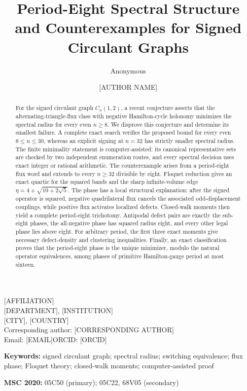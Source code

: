\title{Period-Eight Spectral Structure and Counterexamples for Signed Circulant Graphs}
\ifdefined\TargetAAnonymous
  \author{Anonymous}
\else
  \author{[AUTHOR NAME]}
\fi
\date{}
\maketitle

\ifdefined\TargetAAnonymous\else
\begin{center}
\small
\mbox{[AFFILIATION]}\\
\mbox{[DEPARTMENT]}, \mbox{[INSTITUTION]}\\
\mbox{[CITY]}, \mbox{[COUNTRY]}\\[3pt]
Corresponding author: [CORRESPONDING AUTHOR]\\
Email: [EMAIL]\quad ORCID: [ORCID]
\end{center}
\fi

\begin{abstract}
For the signed circulant graph \(C_n(1,2)\), a recent conjecture asserts that the
alternating-triangle-flux class with negative Hamilton-cycle holonomy minimizes
the spectral radius for every even \(n\geq 8\). We disprove this conjecture and
determine its smallest failure. A complete exact search verifies the proposed
bound for every even \(8\leq n\leq 30\), whereas an explicit signing at \(n=32\)
has strictly smaller spectral radius. The finite minimality statement is
computer-assisted: its canonical representative sets are checked by two
independent enumeration routes, and every spectral decision uses exact integer
or rational arithmetic. The counterexample arises from a period-eight flux
word and extends to every \(n\geq32\) divisible by eight. Floquet reduction gives
an exact quartic for the squared bands and the sharp infinite-volume edge
\(\eta=4+\sqrt{10+2\sqrt{5}}\). The phase has a local structural explanation:
after the signed operator is squared, negative quadrilateral flux cancels the
associated odd-displacement couplings, while positive flux activates localized
defects. Closed-walk moments then yield a complete period-eight trichotomy.
Antipodal defect pairs are exactly the sub-eight phases, the all-negative phase
has squared radius eight, and every other legal phase lies above eight. For
arbitrary period, the first three exact moments give necessary defect-density
and clustering inequalities. Finally, an exact classification proves that the
period-eight phase is the unique minimizer, modulo the natural operator
equivalences, among phases of primitive Hamilton-gauge period at most sixteen.
\end{abstract}

\noindent\textbf{Keywords:} signed circulant graph; spectral radius; switching
equivalence; flux phase; Floquet theory; closed-walk moments; computer-assisted proof\par
\noindent\textbf{MSC 2020:} 05C50 (primary); 05C22, 68V05 (secondary)
